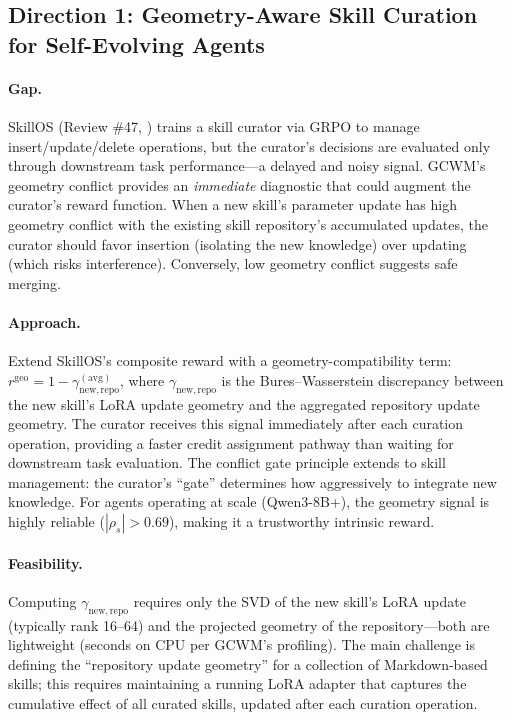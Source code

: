 \documentclass[11pt]{article}
\begin{document}
\subsection{Direction 1: Geometry-Aware Skill Curation for Self-Evolving Agents}

\paragraph{Gap.}
SkillOS (Review \#47, \cite{skillos}) trains a skill curator via GRPO to manage insert/update/delete operations, but the curator's decisions are evaluated only through downstream task performance---a delayed and noisy signal. GCWM's geometry conflict provides an \emph{immediate} diagnostic that could augment the curator's reward function. When a new skill's parameter update has high geometry conflict with the existing skill repository's accumulated updates, the curator should favor insertion (isolating the new knowledge) over updating (which risks interference). Conversely, low geometry conflict suggests safe merging.

\paragraph{Approach.}
Extend SkillOS's composite reward with a geometry-compatibility term: $r^{\mathrm{geo}} = 1 - \gamma_{\mathrm{new, repo}}^{(\mathrm{avg})}$, where $\gamma_{\mathrm{new, repo}}$ is the Bures--Wasserstein discrepancy between the new skill's LoRA update geometry and the aggregated repository update geometry. The curator receives this signal immediately after each curation operation, providing a faster credit assignment pathway than waiting for downstream task evaluation. The conflict gate principle extends to skill management: the curator's ``gate'' determines how aggressively to integrate new knowledge. For agents operating at scale (Qwen3-8B+), the geometry signal is highly reliable ($|\rho_s| > 0.69$), making it a trustworthy intrinsic reward.

\paragraph{Feasibility.}
Computing $\gamma_{\mathrm{new, repo}}$ requires only the SVD of the new skill's LoRA update (typically rank 16--64) and the projected geometry of the repository---both are lightweight (seconds on CPU per GCWM's profiling). The main challenge is defining the ``repository update geometry'' for a collection of Markdown-based skills; this requires maintaining a running LoRA adapter that captures the cumulative effect of all curated skills, updated after each curation operation.
\end{document}
